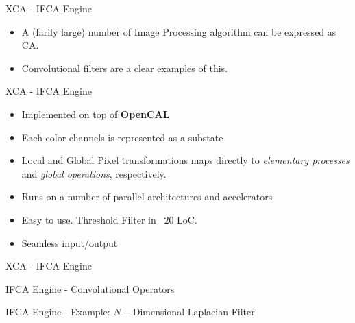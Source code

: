 \documentclass{beamer}
\begin{document}
		\begin{frame}{XCA - IFCA Engine }
		\begin{itemize}
		\item A (farily large) number of Image Processing algorithm can be expressed as CA.
		\item  Convolutional filters are a clear examples of this.
		
		\end{itemize}	
		\end{frame}	
		\begin{frame}{XCA - IFCA Engine}
			\begin{itemize}
			\item Implemented on top of \textbf{OpenCAL}
			\item Each color channels is represented as a substate
			\item Local and Global Pixel transformations maps directly to \textit{elementary processes} and \textit{global operations}, respectively.
			\item Runs on a number of parallel architectures and accelerators
			\item Easy to use. Threshold Filter in ~$20$ LoC.
			\item Seamless input/output
			\end{itemize}
		\end{frame}
		\begin{frame}{XCA - IFCA Engine}
			
		\end{frame}		
		
		\begin{frame}{IFCA Engine - Convolutional Operators}
			
		\end{frame}
		\begin{frame}{IFCA Engine - Example: $N-$Dimensional Laplacian Filter}
			
		\end{frame}	
		
\end{document}

